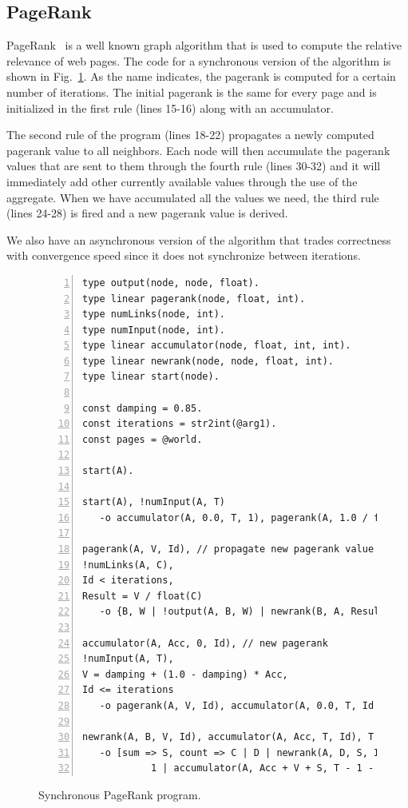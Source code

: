 \subsection{PageRank}

PageRank~\cite{Page:2001:MNR} is a well known graph algorithm that is used to compute the relative relevance of web pages.
The code for a synchronous version of the algorithm is shown in Fig.~\ref{code:pagerank}.
As the name indicates, the pagerank is computed for a certain number of iterations. The initial pagerank is the same for every page and is
initialized in the first rule (lines 15-16) along with an accumulator.

The second rule of the program (lines 18-22) propagates a newly computed pagerank value to all neighbors. Each node will then accumulate
the pagerank values that are sent to them through the fourth rule (lines 30-32) and it will immediately add other currently available values
through the use of the aggregate. When we have accumulated all the values we need, the third rule (lines 24-28) is fired and a new pagerank value is derived.

We also have an asynchronous version of the algorithm that trades correctness with convergence speed since it does not synchronize between iterations.

\begin{figure}[h!]
   \footnotesize\begin{Verbatim}[numbers=left]
type output(node, node, float).
type linear pagerank(node, float, int).
type numLinks(node, int).
type numInput(node, int).
type linear accumulator(node, float, int, int).
type linear newrank(node, node, float, int).
type linear start(node).

const damping = 0.85.
const iterations = str2int(@arg1).
const pages = @world.

start(A).

start(A), !numInput(A, T)
   -o accumulator(A, 0.0, T, 1), pagerank(A, 1.0 / float(pages), 0).

pagerank(A, V, Id), // propagate new pagerank value
!numLinks(A, C),
Id < iterations,
Result = V / float(C)
   -o {B, W | !output(A, B, W) | newrank(B, A, Result, Id + 1)}.

accumulator(A, Acc, 0, Id), // new pagerank
!numInput(A, T),
V = damping + (1.0 - damping) * Acc,
Id <= iterations
   -o pagerank(A, V, Id), accumulator(A, 0.0, T, Id + 1).
	
newrank(A, B, V, Id), accumulator(A, Acc, T, Id), T > 0
   -o [sum => S, count => C | D | newrank(A, D, S, Id) |
            1 | accumulator(A, Acc + V + S, T - 1 - C, Id)].
\end{Verbatim}
\caption{Synchronous PageRank program.}
\label{code:pagerank}
\normalsize
\end{figure}

